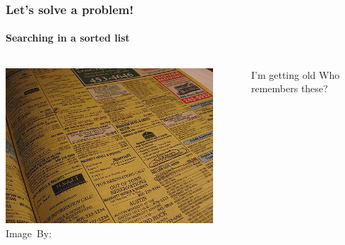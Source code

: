 \begin{frame}
	\frametitle{Let's solve a problem!}
	\framesubtitle{Searching in a sorted list}
	
	\begin{columns}
	\begin{center}
		\includegraphics[width=0.9\textwidth]{images/phonebook.jpg}\\
		\hspace*{15pt}\hbox{\scriptsize Image By:}
	\end{center}
		\begin{block}{I'm getting old}
			Who remembers these?
		\end{block}
			
	\end{columns}
\end{frame}

